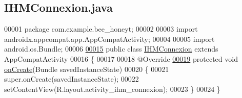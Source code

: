 \hypertarget{_i_h_m_connexion_8java_source}{}\subsection{I\+H\+M\+Connexion.\+java}
\label{_i_h_m_connexion_8java_source}

\begin{DoxyCode}
00001 \textcolor{keyword}{package }com.example.bee\_honeyt;
00002 
00003 \textcolor{keyword}{import} androidx.appcompat.app.AppCompatActivity;
00004 
00005 \textcolor{keyword}{import} android.os.Bundle;
00006 
\hyperlink{classcom_1_1example_1_1bee__honeyt_1_1_i_h_m_connexion}{00015} \textcolor{keyword}{public} \textcolor{keyword}{class }\hyperlink{classcom_1_1example_1_1bee__honeyt_1_1_i_h_m_connexion}{IHMConnexion} \textcolor{keyword}{extends} AppCompatActivity
00016 \{
00017 
00018     @Override
\hyperlink{classcom_1_1example_1_1bee__honeyt_1_1_i_h_m_connexion_a4949c5484f6719c377d94a4a88143fb9}{00019}     \textcolor{keyword}{protected} \textcolor{keywordtype}{void} \hyperlink{classcom_1_1example_1_1bee__honeyt_1_1_i_h_m_connexion_a4949c5484f6719c377d94a4a88143fb9}{onCreate}(Bundle savedInstanceState)
00020     \{
00021         super.onCreate(savedInstanceState);
00022         setContentView(R.layout.activity\_ihm\_connexion);
00023     \}
00024 \}
\end{DoxyCode}

